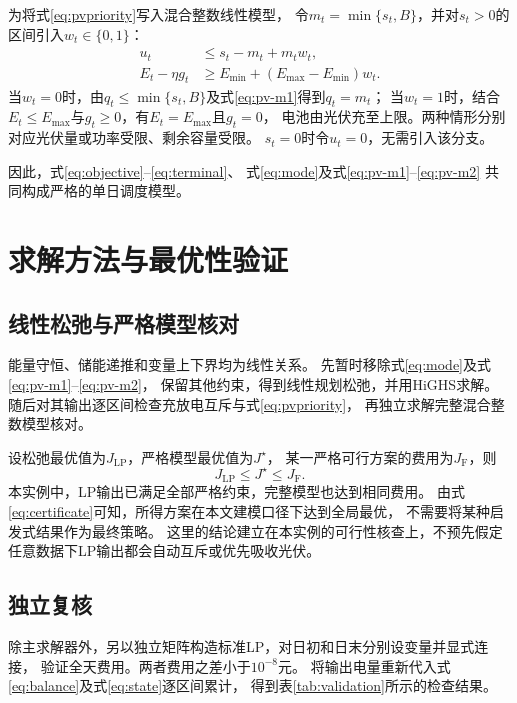 \documentclass[UTF8,a4paper,12pt,fontset=fandol]{ctexart}
\begin{document}
为将式\eqref{eq:pvpriority}写入混合整数线性模型，
令$m_t=\min\{s_t,B\}$，并对$s_t>0$的区间引入$w_t\in\{0,1\}$：
\begin{align}
  u_t&\le s_t-m_t+m_tw_t, \label{eq:pv-m1}\\
  E_t-\eta g_t&\ge E_{\min}+(E_{\max}-E_{\min})w_t.
  \label{eq:pv-m2}
\end{align}
当$w_t=0$时，由$q_t\le\min\{s_t,B\}$及式\eqref{eq:pv-m1}得到$q_t=m_t$；
当$w_t=1$时，结合$E_t\le E_{\max}$与$g_t\ge0$，有$E_t=E_{\max}$且$g_t=0$，
电池由光伏充至上限。两种情形分别对应光伏量或功率受限、剩余容量受限。
$s_t=0$时令$u_t=0$，无需引入该分支。

因此，式\eqref{eq:objective}--\eqref{eq:terminal}、
式\eqref{eq:mode}及式\eqref{eq:pv-m1}--\eqref{eq:pv-m2}
共同构成严格的单日调度模型。

\section{求解方法与最优性验证}
\subsection{线性松弛与严格模型核对}
能量守恒、储能递推和变量上下界均为线性关系。
先暂时移除式\eqref{eq:mode}及式\eqref{eq:pv-m1}--\eqref{eq:pv-m2}，
保留其他约束，得到线性规划松弛，并用HiGHS求解。
随后对其输出逐区间检查充放电互斥与式\eqref{eq:pvpriority}，
再独立求解完整混合整数模型核对。

设松弛最优值为$J_{\mathrm{LP}}$，严格模型最优值为$J^\star$，
某一严格可行方案的费用为$J_{\mathrm F}$，则
\begin{equation}
  J_{\mathrm{LP}}\le J^\star\le J_{\mathrm F}.
  \label{eq:certificate}
\end{equation}
本实例中，LP输出已满足全部严格约束，完整模型也达到相同费用。
由式\eqref{eq:certificate}可知，所得方案在本文建模口径下达到全局最优，
不需要将某种启发式结果作为最终策略。
这里的结论建立在本实例的可行性核查上，不预先假定任意数据下LP输出都会自动互斥或优先吸收光伏。

\subsection{独立复核}
除主求解器外，另以独立矩阵构造标准LP，对日初和日末分别设变量并显式连接，
验证全天费用。两者费用之差小于$10^{-8}$元。
将输出电量重新代入式\eqref{eq:balance}及式\eqref{eq:state}逐区间累计，
得到表\ref{tab:validation}所示的检查结果。
\end{document}
